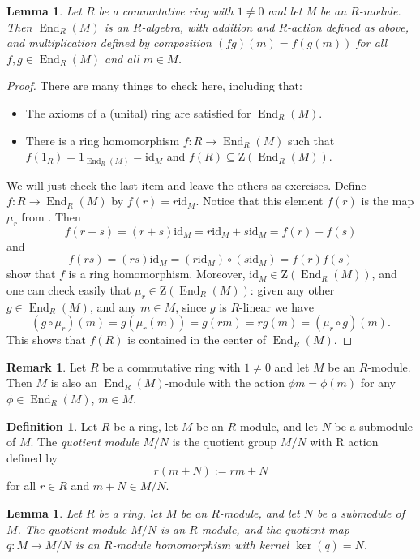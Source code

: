 \documentclass[12pt]{report}
\newtheorem{lemma}[theorem]{Lemma}
\numberwithin{equation}{section}
\numberwithin{theorem}{chapter}
\theoremstyle{definition}
\newtheorem{definition}[theorem]{Definition}
\newtheorem*{basic properties}{Basic Properties}
\newtheorem*{Important Remark}{Important Remark}
\newtheorem{remark}[theorem]{Remark}
\renewcommand{\ker}{\operatorname{ker}}
\DeclareMathOperator{\End}{End}
\begin{document}
\begin{lemma}
 Let $R$ be a commutative ring with $1 \neq 0$ and let M be an $R$-module. Then $\End_R(M)$ is an $R$-algebra, with addition and $R$-action defined as above, and multiplication defined by composition $(fg)(m) = f(g(m))$ for all $f,g \in \End_R(M)$ and all $m \in M$.
\end{lemma}

\begin{proof}
There are many things to check here, including that:
\begin{itemize}
\item The axioms of a (unital) ring are satisfied for $\End_R(M)$.
\item There is a ring homomorphism $f\!:R\to \End_R(M)$ such that $f(1_R)=1_{\End_R(M)}=\mathrm{id}_M$ and $f(R)\subseteq \mathrm{Z}(\End_R(M))$.
\end{itemize}
We will just check the last item and leave the others as exercises. Define $f\!:R\to \End_R(M)$ by $f(r)=r\mathrm{id}_M$. Notice that this element $f(r)$ is the map $\mu_r$ from . Then
$$f(r+s)=(r+s)\mathrm{id}_M=r\mathrm{id}_M+s\mathrm{id}_M=f(r)+f(s)$$ 
and 
$$f(rs)=(rs)\mathrm{id}_M=(r\mathrm{id}_M)\circ(s\mathrm{id}_M)=f(r)f(s)$$
 show that $f$ is a ring homomorphism. Moreover, $\mathrm{id}_M\in \mathrm{Z}(\End_R(M))$, and one can check easily that $\mu_r \in \mathrm{Z}(\End_R(M))$: given any other $g \in \End_R(M)$, and any $m \in M$, since $g$ is $R$-linear we have
$$(g \circ \mu_r)(m) = g(\mu_r(m)) = g(rm) = rg(m) = (\mu_r \circ g) (m).$$ 
This shows that $f(R)$ is contained in the center of $\End_R(M)$.
\end{proof}


\begin{remark}\label{rem:endmodule}
Let $R$ be a commutative ring with $1 \neq 0$ and let $M$ be an $R$-module. Then $M$ is also an $\End_R(M)$-module with the action $\phi m=\phi(m)$ for any $\phi\in \End_R(M)$, $m\in M$.
\end{remark}



\begin{definition} 
Let $R$ be a ring, let $M$ be an $R$-module, and let $N$ be a submodule of $M$. The \emph{quotient module} $M/N$ is the quotient group $M/N$ with R action defined by 
$$r(m + N) := rm + N$$ 
for all $r \in R$ and $m + N \in M/N$.
\end{definition}

\begin{lemma}
Let $R$ be a ring, let $M$ be an $R$-module, and let $N$ be a submodule of $M$. The quotient module $M/N$ is an $R$-module, and the quotient map $q\!: M \to M/N$ is an $R$-module homomorphism with kernel $\ker(q) = N$.
\end{lemma}
\end{document}
